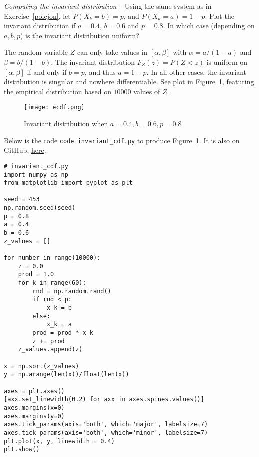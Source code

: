 \documentclass[oneside,10pt]{book}
\begin{document}
\begin{Exercise}\label{polcjonb} {\em Computing the invariant distribution} -- 
Using the same system as in Exercise~\ref{polcjon}, let $P(X_k = b) = p$, and $P(X_k=a) = 1-p$. 
Plot the invariant distribution
  if $a=0.4$, $b=0.6$ and $p=0.8$. In which case (depending on $a,b,p$) is the invariant distribution uniform?\vspace{1ex}


\noindent The random variable $Z$ can only take values in $[\alpha, \beta]$ with $\alpha = a/(1-a)$ and $\beta=b/(1-b)$. The invariant
 distribution $F_Z(z) = P(Z<z)$ is uniform on $[\alpha,\beta]$ if and only if $b=p$, and thus $a=1-p$. In all other cases, the 
 invariant distribution is singular and nowhere differentiable. See plot in Figure~\ref{fig:r1lkn2x}, 
 featuring the \textcolor{index}{empirical distribution} based on $\num{10000}$ values of $Z$. 

\begin{figure}[H]
\centering
\texttt{[image: ecdf.png]}  
\caption{Invariant distribution when $a=0.4, b=0.6, p=0.8$}
\label{fig:r1lkn2x}
\end{figure}

\noindent Below is the code \texttt{code invariant\_cdf.py} to produce Figure~\ref{fig:r1lkn2x}. 
It is also on GitHub, \href{https://github.com/VincentGranville/Stochastic-Processes/blob/master/invariant_cdf.py}{here}. 
\vspace{1ex} 

\begin{lstlisting}
# invariant_cdf.py
import numpy as np
from matplotlib import pyplot as plt

seed = 453
np.random.seed(seed)
p = 0.8
a = 0.4
b = 0.6
z_values = []

for number in range(10000):
    z = 0.0
    prod = 1.0
    for k in range(60):
        rnd = np.random.rand()
        if rnd < p:
            x_k = b
        else:
            x_k = a
        prod = prod * x_k
        z += prod
    z_values.append(z)

x = np.sort(z_values)
y = np.arange(len(x))/float(len(x))

axes = plt.axes()
[axx.set_linewidth(0.2) for axx in axes.spines.values()]
axes.margins(x=0)
axes.margins(y=0)
axes.tick_params(axis='both', which='major', labelsize=7)
axes.tick_params(axis='both', which='minor', labelsize=7)
plt.plot(x, y, linewidth = 0.4)
plt.show()
\end{lstlisting}

\end{Exercise}
\end{document}
